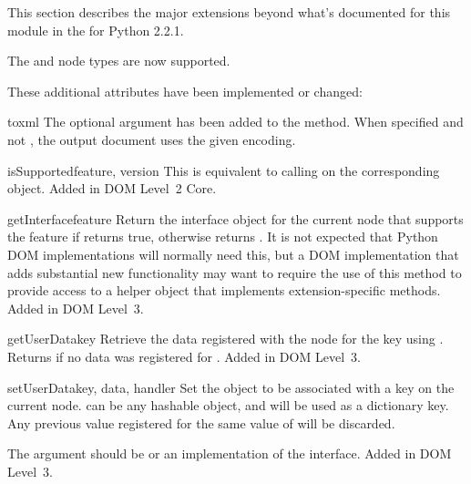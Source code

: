 \documentclass{howto}
\begin{document}
This section describes the major extensions beyond what's documented
for this module in the  for Python 2.2.1.

The  and  node types are now supported.

These additional  attributes have been implemented or
changed:

\begin{methoddesc}[Node]{toxml}{}
  The optional  argument has been added to the
   method.  When specified and not , the
  output document uses the given encoding.
\end{methoddesc}

\begin{methoddesc}[Node]{isSupported}{feature, version}
  This is equivalent to calling  on the corresponding 
  object.  Added in DOM Level~2 Core.
\end{methoddesc}

\begin{methoddesc}[Node]{getInterface}{feature}
  Return the interface object for the current node that supports the
   feature if 
  returns true, otherwise returns .  It is not expected
  that Python DOM implementations will normally need this, but a DOM
  implementation that adds substantial new functionality may want to
  require the use of this method to provide access to a helper object
  that implements extension-specific methods.
  Added in DOM Level~3.
\end{methoddesc}

\begin{methoddesc}[Node]{getUserData}{key}
  Retrieve the data registered with the node for the key 
  using .  Returns  if no data was
  registered for .
  Added in DOM Level~3.
\end{methoddesc}

\begin{methoddesc}[Node]{setUserData}{key, data, handler}
  Set the object  to be associated with a key  on
  the current node.   can be any hashable object, and will be
  used as a dictionary key.  Any previous value registered for the
  same value of  will be discarded.

  The  argument should be  or an
  implementation of the  interface.
  Added in DOM Level~3.
\end{methoddesc}
\end{document}
